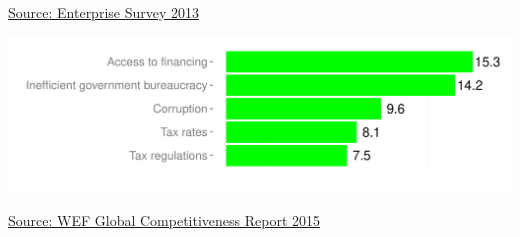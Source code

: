 \documentclass{article}\usepackage[]{graphicx}\usepackage[]{color}
\makeatletter
\def\maxwidth{ %
  \ifdim\Gin@nat@width>\linewidth
    \linewidth
  \else
    \Gin@nat@width
  \fi
}
\makeatother
\begin{document}
\begin{minipage}[b]{0.99\textwidth}
\begin{minipage}[b]{0.99\textwidth}
\begin{minipage}[c]{0.49\textwidth}
{}



      \hspace*{0.3cm} \raggedright\footnotesize{\href{https://www.enterprisesurveys.org/data}{Source: Enterprise Survey 2013}}
    \end{minipage}
    \begin{minipage}[c]{0.49\textwidth} %


{\centering \includegraphics[width=\maxwidth]{figure/top5constraintsWEF-1} 

}



    \hspace*{0.3cm} \raggedright\footnotesize{\href{http://www.weforum.org/reports/global-competitiveness-report-2015-2016}{Source: WEF Global Competitiveness Report 2015}}
    \end{minipage}
  \end{minipage}
\end{minipage}


\end{document}
